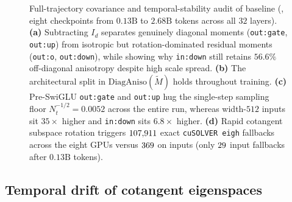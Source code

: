 \begin{figure}[t]
{%
}
\caption{Full-trajectory covariance and temporal-stability audit of baseline
 (\nullall{}, eight checkpoints from $0.13\text{B}$ to $2.68\text{B}$
tokens across all $32$ layers). \textbf{(a)} Subtracting $I_d$ separates
genuinely diagonal moments (\texttt{out:gate}, \texttt{out:up}) from isotropic
but rotation-dominated residual moments (\texttt{out:o}, \texttt{out:down}),
while showing why \texttt{in:down} still retains $56.6\%$ off-diagonal
anisotropy despite high scale spread. \textbf{(b)} The architectural split in
$\mathrm{DiagAniso}(\tilde M)$ holds throughout training. \textbf{(c)}
Pre-SwiGLU \texttt{out:gate} and \texttt{out:up} hug the single-step sampling
floor $N_t^{-1/2}=0.0052$ across the entire run, whereas width-$512$ inputs sit
$35\times$ higher and \texttt{in:down} sits $6.8\times$ higher. \textbf{(d)}
Rapid cotangent subspace rotation triggers $107{,}911$ exact
\texttt{cuSOLVER eigh} fallbacks across the eight GPUs versus $369$ on
inputs (only $29$ input fallbacks after $0.13\text{B}$ tokens).}
\label{fig:motivation}
\end{figure}

\subsection{Temporal drift of cotangent eigenspaces}
\label{sec:mot-drift}

